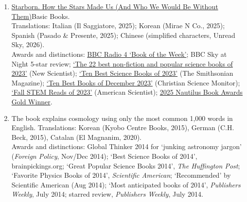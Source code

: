 \vspace{\baselineskip}
\begin{enumerate}
\item 
{}
{\href{https://www.hachettebookgroup.com/titles/roberto-trotta/starborn/9781541674776/}{Starborn. How the Stars Made Us (And Who We Would Be Without Them)}}{Basic Books}.  \\ Translations: Italian (Il Saggiatore, 2025); Korean (Mirae N Co., 2025); Spanish (Pasado \& Presente, 2025); Chinese (simplified characters, Unread Sky, 2026).
\\ Awards and distinctions: \href{https://www.bbc.co.uk/programmes/m001tgjy}{BBC Radio 4 `Book of the Week'}; BBC Sky at Night 5-star review; \href{https://www.newscientist.com/article/mg26034670-400-the-22-best-non-fiction-and-popular-science-books-of-2023/}{`The 22 best non-fiction and popular science books of 2023'} (New Scientist); \href{https://www.smithsonianmag.com/science-nature/the-ten-best-science-books-of-2023-180983371/}{`Ten Best Science Books of 2023'} (The Smithsonian Magazine); \href{https://www.csmonitor.com/Books/2023/1221/Barbra-Ella-and-Benedict-Arnold-entertain-in-December-s-10-best-books}{`Ten Best Books of December 2023'} (Christian Science Monitor); \href{https://www.americanscientist.org/blog/science-culture/fall-stem-reads-of-2023}{`Fall STEM Reads of 2023'} (American Scientist); \href{https://www.nautilusbookawards.com/2025-nautilus-winners}{2025 Nautilus Book Awards Gold Winner}.

\item
{}
The book explains cosmology using only the most common 1,000 words in English. Translations: Korean (Kyobo Centre Books, 2015), German (C.H. Beck, 2015), Catalan (El Magnanim, 2020). 
\\Awards and distinctions: Global Thinker 2014 for `junking astronomy jargon' ({\em Foreign Policy}, Nov/Dec 2014); `Best Science Books of 2014', brainpickings.org; `Great Popular Science Books 2014', {\em The Huffington Post}; `Favorite Physics Books of 2014', {\em Scientific American}; `Recommended' by Scientific American (Aug 2014); `Most anticipated books of 2014', {\em Publishers Weekly}, July 2014; starred review, {\em Publishers Weekly}, July 2014.
\end{enumerate}
\setcounter{nPEBooks}{\value{enumi}}


